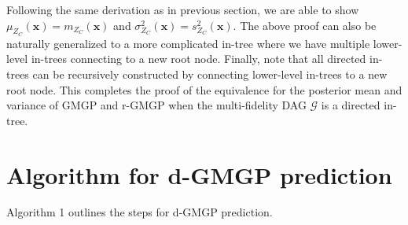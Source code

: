 \documentclass[12pt]{article}
\newcommand{\bs}[1]{\boldsymbol{#1}}
\begin{document}
Following the same derivation as in previous section, we are able to show $\mu_{Z_C}(\bs{x})=m_{Z_C}(\bs{x})$ and $\sigma_{Z_C}^2(\bs{x})=s_{Z_C}^2(\bs{x})$. The above proof can also be naturally generalized to a more complicated in-tree where we have multiple lower-level in-trees connecting to a new root node. Finally, note that all directed in-trees can be recursively constructed by connecting lower-level in-trees to a new root node. This completes the proof of the equivalence for the posterior mean and variance of GMGP and r-GMGP when the multi-fidelity DAG $\mathcal{G}$ is a directed in-tree.

\newpage

\section{Algorithm for d-GMGP prediction}
Algorithm 1 outlines the steps for d-GMGP prediction.
\end{document}
